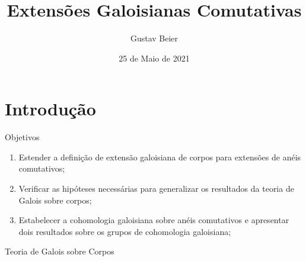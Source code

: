 \documentclass{beamer}
\title{Extensões Galoisianas Comutativas}
\author{Gustav Beier}
\institute{PPGMat - UFRGS}
\date{25 de Maio de 2021}
\begin{document}
\begin{frame}
    \titlepage
\end{frame}

            \section{Introdução}
\begin{frame}{Objetivos}
    \begin{enumerate}
        \item Estender a definição de extensão galoisiana de corpos para extensões de anéis comutativos;
        \item Verificar as hipóteses necessárias para generalizar os resultados da teoria de Galois sobre corpos;
        \item Estabelecer a cohomologia galoisiana sobre anéis comutativos e apresentar dois resultados sobre os grupos de cohomologia galoisiana;
    \end{enumerate}
\end{frame}
\begin{frame}[fragile]{Teoria de Galois sobre Corpos}
    \begin{center}
    \end{center}
\end{frame}
\end{document}
